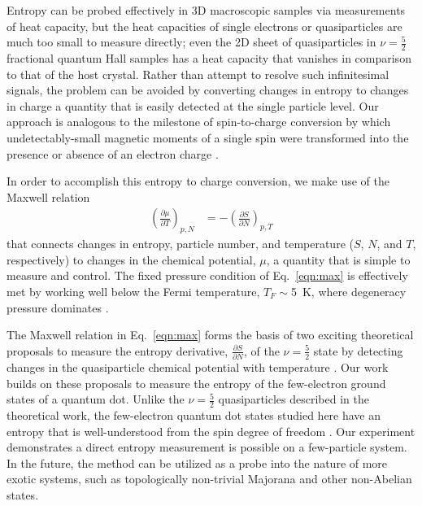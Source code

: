 \documentclass[twocolumn,showpacs,preprintnumbers,amsmath,amssymb,pra,aps,superscriptaddress]{revtex4-1}
\begin{document}
Entropy can be probed effectively in 3D macroscopic samples via measurements of heat capacity, but the heat capacities of single electrons or quasiparticles are much too small to measure directly; even the 2D sheet of quasiparticles in $\nu = \frac{5}{2}$ fractional quantum Hall samples has a heat capacity that vanishes in comparison to that of the host crystal.  Rather than attempt to resolve such infinitesimal signals, the problem can be avoided by converting changes in entropy to changes in charge \textemdash a quantity that is easily detected at the single particle level.  Our approach is analogous to the milestone of spin-to-charge conversion by which undetectably-small magnetic moments of a single spin were transformed into the presence or absence of an electron charge \cite{Elzerman2004, Ono2004}.

In order to accomplish this entropy to charge conversion, we make use of the Maxwell relation
%
\begin{align}
\label{eqn:max}
        \left(\frac{\partial \mu}{\partial T}\right)_{p,N} &= -\left(\frac{\partial S}{\partial N}\right)_{p,T}
\end{align}
%
that connects changes in entropy, particle number, and temperature ($S$, $N$, and $T$, respectively) to changes in the chemical potential, $\mu$, a quantity that is simple to measure and control. The fixed pressure condition of Eq.~\ref{eqn:max} is effectively met by working well below the Fermi temperature, $T_F \sim$\SI{5}{\kelvin}, where degeneracy pressure dominates \cite{Landau1969}.

The Maxwell relation in Eq.~\ref{eqn:max} forms the basis of two exciting theoretical proposals to measure the entropy derivative, $\frac{\partial S}{\partial N}$, of the $\nu = \frac{5}{2}$ state by detecting changes in the quasiparticle chemical potential with temperature \cite{Cooper2009,Ben-Shach2013}.  Our work builds on these proposals to measure the entropy of the few-electron ground states of a quantum dot. Unlike the $\nu = \frac{5}{2}$ quasiparticles described in the theoretical work, the few-electron quantum dot states studied here have an entropy that is well-understood from the spin degree of freedom \cite{Tarucha1996, Ciorga2000, Duncan2000, Lindemann2002, Potok2003, Hofmann2016}. Our experiment demonstrates a direct entropy measurement is possible on a few-particle system. In the future, the method can be utilized as a probe into the nature of more exotic systems, such as topologically non-trivial Majorana and other non-Abelian states. 
\end{document}
